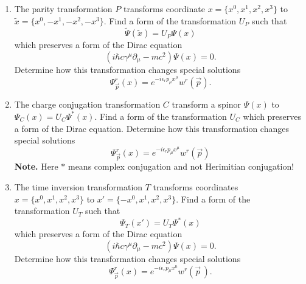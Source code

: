 \documentclass[a4paper,11pt]{article}
\begin{document}
\begin{enumerate}
\item The parity transformation $P$ transforms coordinate
  $x = \{ x^{ 0 }, x^{ 1 }, x^{ 2 }, x^{ 3 } \}$ to
  $\widetilde{x} = \{ x^{ 0 }, -x^{ 1 }, -x^{ 2 }, -x^{ 3 } \}$. Find
  a form of the transformation $U_{ P }$ such that
  \begin{equation}
    \label{QM:10}
    \widetilde{\Psi}( \widetilde{x} ) = U_{ P } \Psi( x )
  \end{equation}
  which preserves a form of the Dirac equation
  \begin{equation}
    \label{QM:11}
    \left( i \hbar c \gamma^{ \mu } \partial_{ \mu } - m c^{ 2 } \right) \Psi( x ) = 0.
  \end{equation}
  Determine how this transformation changes special solutions
  \begin{equation}
    \label{QM:12}
    \Psi_{ \vec{ p } }^{ r }( x )
    = e^{ -i \epsilon_{ r } p_{ \mu } x^{ \mu } } w^{ r }( \vec{ p } ).
  \end{equation}

\item The charge conjugation transformation $C$ transform a spinor
  $\Psi( x )$ to $\Psi_{ C }( x ) = U_{ C } \Psi^{ * }( x )$. Find a
  form of the transformation $U_{ C }$ which preserves a form of the
  Dirac equation. Determine how this transformation changes special
  solutions
  \begin{equation}
    \label{QM:13}
    \Psi_{ \vec{ p } }^{ r }( x )
    = e^{ -i \epsilon_{ r } p_{ \mu } x^{ \mu } } w^{ r }( \vec{ p } )
  \end{equation}
  \textbf{Note.} Here $*$ means complex conjugation and not Herimitian
  conjugation!

\item The time inversion transformation $T$ transforms coordinates
  $x = \{ x^{ 0 }, x^{ 1 }, x^{ 2 }, x^{ 3 } \}$ to
  $x' = \{ -x^{ 0 }, x^{ 1 }, x^{ 2 }, x^{ 3 } \}$. Find a form of the
  transformation $U_{ T }$ such that
  \begin{equation}
    \label{QM:14}
    \Psi_{ T }( x' ) = U_{ T } \Psi^{ * }( x )
  \end{equation}
  which preserves a form of the Dirac equation
  \begin{equation}
    \label{QM:15}
    \left( i\hbar c \gamma^{ \mu } \partial_{ \mu } - m c^{ 2 } \right) \Psi( x ) = 0.
  \end{equation}
  Determine how this transformation changes special solutions
  \begin{equation}
    \label{QM:16}
    \Psi_{ \vec{ p } }^{ r }( x )
    = e^{ -i\epsilon_{ r } p_{ \mu } x^{ \mu } } w^{ r }( \vec{ p } \, ).
  \end{equation}


\end{enumerate}
\end{document}
